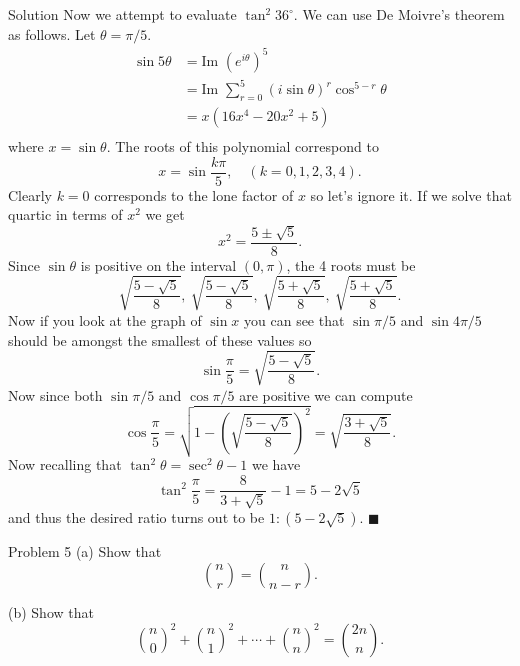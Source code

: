 \documentclass{article}
\begin{document}
\begin{solution}{Solution}
Now we attempt to evaluate $\tan^2 36^\circ$. We can use De Moivre's
theorem as follows. Let $\theta = \pi/5$.
\[
\begin{aligned}
\sin 5\theta &= \text{Im } (e^{i\theta})^5\\
&= \text{Im } \sum_{r=0}^5 (i\sin \theta)^r \cos^{5-r} \theta \\
&= x(16x^4 - 20x^2 + 5) \\
\end{aligned}
\]
where $x = \sin \theta$. The roots of this polynomial correspond to
$$
x = \sin \frac{k \pi}{5}, \quad (k = 0, 1, 2, 3, 4).
$$
Clearly $k=0$ corresponds to the lone factor of $x$ so let's ignore it.
If we solve that quartic in terms of $x^2$ we get
$$
x^2 = \frac{5 \pm \sqrt{5}}{8}.
$$
Since $\sin \theta$ is positive on the interval $(0, \pi)$, the 4 roots must
be
$$
\sqrt{\frac{5-\sqrt{5}}{8}}, \ \sqrt{\frac{5-\sqrt{5}}{8}}, \
\sqrt{\frac{5+\sqrt{5}}{8}}, \ \sqrt{\frac{5+\sqrt{5}}{8}}.
$$
Now if you look at the graph of $\sin x$ you can see that $\sin \pi/5$ and
$\sin 4\pi/5$
should be amongst the smallest of these values so
$$
\sin \frac{\pi}{5} = \sqrt{\frac{5-\sqrt5}{8}}.
$$
Now since both $\sin \pi/5$ and $\cos \pi/5$ are positive we can compute
$$
\cos\frac{\pi}{5} = \sqrt{1 - \left(\sqrt{\frac{5-\sqrt5}{8}}\right)^2} =
\sqrt{\frac{3+\sqrt{5}}{8}}.
$$
Now recalling that $\tan^2 \theta = \sec^2 \theta -1$ we have
$$
\tan^2 \frac{\pi}{5} = \frac{8}{3+\sqrt5} - 1 = 5 - 2\sqrt5
$$
and thus the desired ratio turns out to be $1 : (5-2\sqrt5)$. $\blacksquare$
\end{solution}
\newpage

\begin{problem}{Problem 5}
(a) Show that
$$
\binom{n}{r} = \binom{n}{n-r}.
$$

(b) Show that
$$
\binom{n}{0}^2 + \binom{n}{1}^2 + \cdots + \binom{n}{n}^2 = \binom{2n}{n}.
$$
\end{problem}
\end{document}
